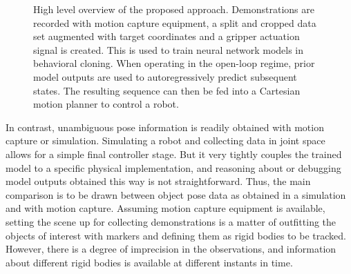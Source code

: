\documentclass{article}
\begin{document}
\begin{figure}
	\centering
	\caption{High level overview of the proposed approach. Demonstrations are recorded with motion capture equipment, a split and cropped data set augmented with target coordinates and a gripper actuation signal is created. This is used to train neural network models in behavioral cloning. When operating in the open-loop regime, prior model outputs are used to autoregressively predict subsequent states. The resulting sequence can then be fed into a Cartesian motion planner to control a robot.}
	\label{fig:approach}
\end{figure}

In contrast, unambiguous pose information is readily obtained with motion capture or simulation. Simulating a robot and collecting data in joint space allows for a simple final controller stage. But it very tightly couples the trained model to a specific physical implementation, and reasoning about or debugging model outputs obtained this way is not straightforward. Thus, the main comparison is to be drawn between object pose data as obtained in a simulation and with motion capture. Assuming motion capture equipment is available, setting the scene up for collecting demonstrations is a matter of outfitting the objects of interest with markers and defining them as rigid bodies to be tracked. However, there is a degree of imprecision in the observations, and information about different rigid bodies is available at different instants in time. 
\end{document}
